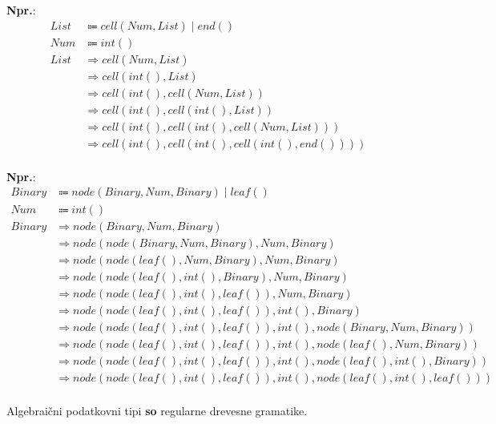 \documentclass{report}
\newcommand{\Ex}{\textbf{Npr.}:\ }
\newcommand{\Union}{\mathrel{|}}
\newcommand{\Arrow}{\Coloneq}
\newcommand{\Derive}{\Rightarrow}
\begin{document}
\Ex
\begin{equation*}
  \begin{aligned}
    List &\Arrow cell(Num, List) \Union end()\\
    Num &\Arrow int()\\[1em]
    List &\Derive cell(Num, List)\\
      &\Derive cell(int(), List)\\
      &\Derive cell(int(), cell(Num, List))\\
      &\Derive cell(int(), cell(int(), List))\\
      &\Derive cell(int(), cell(int(), cell(Num, List)))\\
      &\Derive cell(int(), cell(int(), cell(int(), end())))\\
  \end{aligned}
\end{equation*}

\Ex
\begin{equation*}
  \begin{aligned}
    Binary &\Arrow node(Binary, Num, Binary) \Union leaf()\\
    Num &\Arrow int()\\[1em]
    Binary &\Derive node(Binary, Num, Binary)\\
      &\Derive node(node(Binary, Num, Binary), Num, Binary)\\
      &\Derive node(node(leaf(), Num, Binary), Num, Binary)\\
      &\Derive node(node(leaf(), int(), Binary), Num, Binary)\\
      &\Derive node(node(leaf(), int(), leaf()), Num, Binary)\\
      &\Derive node(node(leaf(), int(), leaf()), int(), Binary)\\
      &\Derive node(node(leaf(), int(), leaf()), int(), node(Binary, Num, Binary))\\
      &\Derive node(node(leaf(), int(), leaf()), int(), node(leaf(), Num, Binary))\\
      &\Derive node(node(leaf(), int(), leaf()), int(), node(leaf(), int(), Binary))\\
      &\Derive node(node(leaf(), int(), leaf()), int(), node(leaf(), int(), leaf()))\\
  \end{aligned}
\end{equation*}

Algebraični podatkovni tipi \textbf{so} regularne drevesne gramatike.
\end{document}
